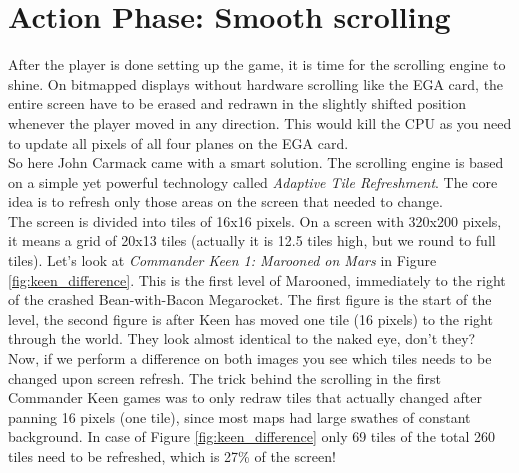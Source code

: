 \documentclass[book.tex]{subfiles}
\begin{document}
\section{Action Phase: Smooth scrolling}
\label{section:adaptive_tile_refresh}
After the player is done setting up the game, it is time for the scrolling engine to shine. On bitmapped displays without hardware scrolling like the EGA card, the entire screen have to be erased and redrawn in the slightly shifted position whenever the player moved in any direction. This would kill the CPU as you need to update all pixels of all four planes on the EGA card.\\ 

So here John Carmack came with a smart solution. The scrolling engine is based on a simple yet powerful technology called \textit{Adaptive Tile Refreshment}. The core idea is to  refresh only those areas on the screen that needed to change.\\

The screen is divided into tiles of 16x16 pixels. On a screen with 320x200 pixels, it means a grid of 20x13 tiles (actually it is 12.5 tiles high, but we round to full tiles). Let's look at \textit{Commander Keen 1: Marooned on Mars} in Figure \ref{fig:keen_difference}. This is the first level of Marooned, immediately to the right of the crashed Bean-with-Bacon Megarocket. The first figure is the start of the level, the second figure is after Keen has moved one tile (16 pixels) to the right through the world. They look almost identical to the naked eye, don't they? \\

Now, if we perform a difference on both images you see which tiles needs to be changed upon screen refresh. The trick behind the scrolling in the first Commander Keen games was to only redraw tiles that actually changed after panning 16 pixels (one tile), since most maps had large swathes of constant background. In case of Figure \ref{fig:keen_difference} only 69 tiles of the total 260 tiles need to be refreshed, which is 27\% of the screen! 
\end{document}
